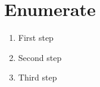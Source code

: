 \documentclass{article}
\begin{document}
\section{Enumerate}
\begin{enumerate}
\item First step
\item Second step
\item Third step
\end{enumerate}
\end{document}
